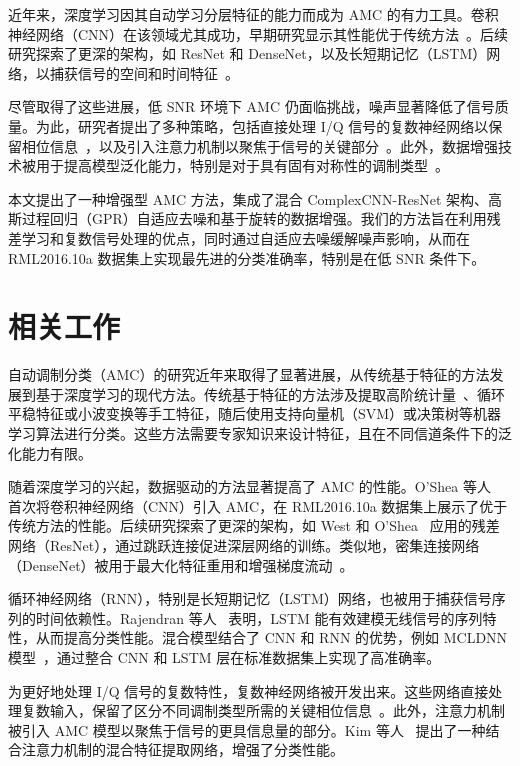 \documentclass[conference]{IEEEtran}
\begin{document}
近年来，深度学习因其自动学习分层特征的能力而成为 AMC 的有力工具。卷积神经网络（CNN）在该领域尤其成功，早期研究显示其性能优于传统方法~\cite{oshea2016convolutional}。后续研究探索了更深的架构，如 ResNet 和 DenseNet，以及长短期记忆（LSTM）网络，以捕获信号的空间和时间特征~\cite{west2017deep,rajendran2018deep}。

尽管取得了这些进展，低 SNR 环境下 AMC 仍面临挑战，噪声显著降低了信号质量。为此，研究者提出了多种策略，包括直接处理 I/Q 信号的复数神经网络以保留相位信息~\cite{li2023lightweight}，以及引入注意力机制以聚焦于信号的关键部分~\cite{kim2020efficient}。此外，数据增强技术被用于提高模型泛化能力，特别是对于具有固有对称性的调制类型~\cite{zhang2023efficient}。

本文提出了一种增强型 AMC 方法，集成了混合 ComplexCNN-ResNet 架构、高斯过程回归（GPR）自适应去噪和基于旋转的数据增强。我们的方法旨在利用残差学习和复数信号处理的优点，同时通过自适应去噪缓解噪声影响，从而在 RML2016.10a 数据集上实现最先进的分类准确率，特别是在低 SNR 条件下。



\section{相关工作}
自动调制分类（AMC）的研究近年来取得了显著进展，从传统基于特征的方法发展到基于深度学习的现代方法。传统基于特征的方法涉及提取高阶统计量~\cite{hazza2013overview}、循环平稳特征或小波变换等手工特征，随后使用支持向量机（SVM）或决策树等机器学习算法进行分类。这些方法需要专家知识来设计特征，且在不同信道条件下的泛化能力有限。

随着深度学习的兴起，数据驱动的方法显著提高了 AMC 的性能。O'Shea 等人~\cite{oshea2016convolutional} 首次将卷积神经网络（CNN）引入 AMC，在 RML2016.10a 数据集上展示了优于传统方法的性能。后续研究探索了更深的架构，如 West 和 O'Shea~\cite{west2017deep} 应用的残差网络（ResNet），通过跳跃连接促进深层网络的训练。类似地，密集连接网络（DenseNet）被用于最大化特征重用和增强梯度流动~\cite{patil2021automatic}。

循环神经网络（RNN），特别是长短期记忆（LSTM）网络，也被用于捕获信号序列的时间依赖性。Rajendran 等人~\cite{rajendran2018deep} 表明，LSTM 能有效建模无线信号的序列特性，从而提高分类性能。混合模型结合了 CNN 和 RNN 的优势，例如 MCLDNN 模型~\cite{xu2020spatiotemporal}，通过整合 CNN 和 LSTM 层在标准数据集上实现了高准确率。

为更好地处理 I/Q 信号的复数特性，复数神经网络被开发出来。这些网络直接处理复数输入，保留了区分不同调制类型所需的关键相位信息~\cite{li2023lightweight}。此外，注意力机制被引入 AMC 模型以聚焦于信号的更具信息量的部分。Kim 等人~\cite{kim2020efficient} 提出了一种结合注意力机制的混合特征提取网络，增强了分类性能。
\end{document}
